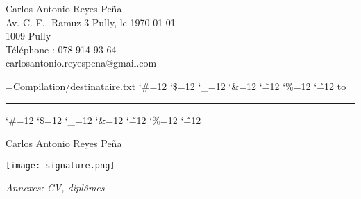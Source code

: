 \documentclass{article}
\newcommand{\readtextfile}[1]{%
    \begingroup
    \catcode`\#=12 %
    \catcode`\$=12 %
    \catcode`\_=12 %
    \catcode`\&=12 %
    \catcode`\~=12 %
    \catcode`\%=12 %
    \catcode`\^=12 %
    \endgroup
}
\begin{document}
\sffamily%

\newcommand{\readdestfile}[1]{
    \newread\file
    \openin\file=#1
    \begingroup
    \obeylines
    \everypar{\tabto{30em}}
    \catcode`\#=12 %
    \catcode`\$=12 %
    \catcode`\_=12 %
    \catcode`\&=12 %
    \catcode`\~=12 %
    \catcode`\%=12 %
    \catcode`\^=12 %
    \loop\unless\ifeof\file
        \read\file to \line
        \ifeof\file\else\line\par\fi
    \repeat
    \closein\file
    \endgroup
}

Carlos Antonio Reyes Peña \\
Av. C.-F.- Ramuz 3 \tabto{30em} Pully, le \today \\
1009 Pully \\
Téléphone : 078 914 93 64 \\
carlosantonio.reyespena@gmail.com




\begingroup
\parskip=0pt %
\readdestfile{Compilation/destinataire.txt}
\endgroup

\bigskip
\bigskip
\bigskip


\vspace*{0.6in} %
\textbf{}
\vspace{0.1\baselineskip} %
\hrule height 0.5pt %



\readtextfile{Compilation/corp.txt} %


\bigskip
\bigskip


\tabto{30em} Carlos Antonio Reyes Peña
\bigskip
\bigskip
\bigskip

\tabto{30em}\texttt{[image: signature.png]} %

\vfill %

\begin{minipage}[t]{\textwidth}
\textit{Annexes: CV, diplômes}
\end{minipage}
\end{document}
